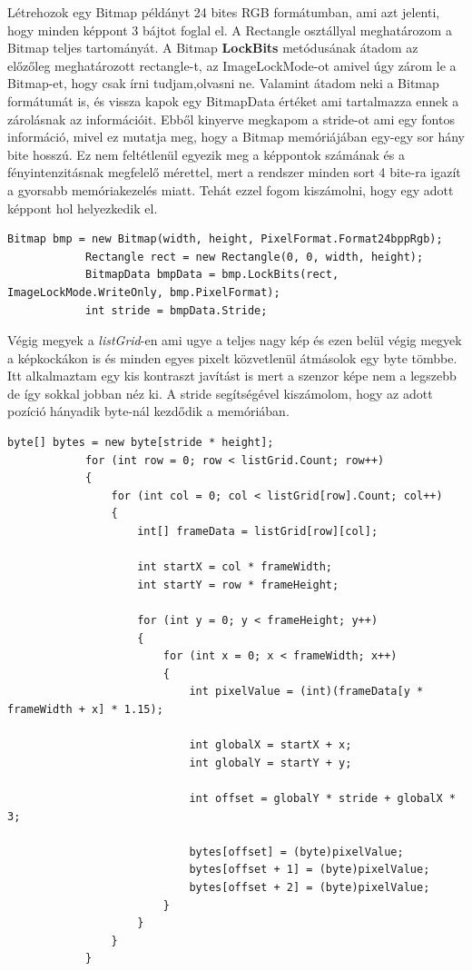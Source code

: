 \documentclass[]{thesis-ekf}
\theoremstyle{definition}
\theoremstyle{remark}
\begin{document}
		Létrehozok egy Bitmap példányt 24 bites RGB formátumban, ami azt jelenti, hogy minden képpont 3 bájtot foglal el. A Rectangle\cite{rectangle} osztállyal meghatározom a Bitmap teljes tartományát. A Bitmap \textbf{LockBits} metódusának átadom az előzőleg meghatározott rectangle-t, az ImageLockMode-ot amivel úgy zárom le a Bitmap-et, hogy csak írni tudjam,olvasni ne. Valamint átadom neki a Bitmap formátumát is, és vissza kapok egy BitmapData értéket ami tartalmazza ennek a zárolásnak az információit. Ebből kinyerve megkapom a stride-ot ami egy fontos információ, mivel ez mutatja meg, hogy a Bitmap memóriájában egy-egy sor hány bite hosszú. Ez nem feltétlenül egyezik meg a képpontok számának és a fényintenzitásnak megfelelő mérettel, mert a rendszer minden sort 4 bite-ra igazít a gyorsabb memóriakezelés miatt. Tehát ezzel fogom kiszámolni, hogy egy adott képpont hol helyezkedik el.
		\begin{lstlisting}[language=CSharp]	 	
			Bitmap bmp = new Bitmap(width, height, PixelFormat.Format24bppRgb);
			Rectangle rect = new Rectangle(0, 0, width, height);
			BitmapData bmpData = bmp.LockBits(rect, ImageLockMode.WriteOnly, bmp.PixelFormat);	 	
			int stride = bmpData.Stride;
		\end{lstlisting}
		Végig megyek a \emph{listGrid}-en ami ugye a teljes nagy kép és ezen belül végig megyek a képkockákon is és minden egyes pixelt közvetlenül átmásolok egy byte tömbbe. Itt alkalmaztam egy kis kontraszt javítást is mert a szenzor képe nem a legszebb de így sokkal jobban néz ki. A stride segítségével kiszámolom, hogy az adott pozíció hányadik byte-nál kezdődik a memóriában.
		\begin{lstlisting}[language=CSharp]	
			byte[] bytes = new byte[stride * height];
			for (int row = 0; row < listGrid.Count; row++)
			{
				for (int col = 0; col < listGrid[row].Count; col++)
				{
					int[] frameData = listGrid[row][col];
					
					int startX = col * frameWidth;
					int startY = row * frameHeight;
					
					for (int y = 0; y < frameHeight; y++)
					{
						for (int x = 0; x < frameWidth; x++)
						{
							int pixelValue = (int)(frameData[y * frameWidth + x] * 1.15); 
							
							int globalX = startX + x;
							int globalY = startY + y;
							
							int offset = globalY * stride + globalX * 3;
							
							bytes[offset] = (byte)pixelValue;       
							bytes[offset + 1] = (byte)pixelValue;   
							bytes[offset + 2] = (byte)pixelValue;     
						}
					}
				}
			}
		\end{lstlisting}
\end{document}

